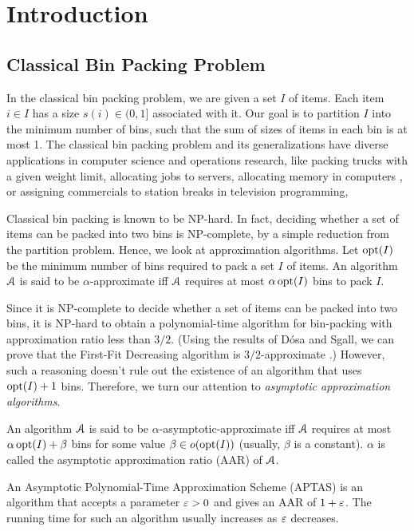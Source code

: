 \chapter{Introduction}
\label{chap:intro}

\section{Classical Bin Packing Problem}

In the classical bin packing problem, we are given a set $I$ of items.
Each item $i \in I$ has a size $s(i) \in (0, 1]$ associated with it.
Our goal is to partition $I$ into the minimum number of bins,
such that the sum of sizes of items in each bin is at most 1.
The classical bin packing problem and its generalizations
have diverse applications in computer science and operations research,
like packing trucks with a given weight limit,
allocating jobs to servers,
allocating memory in computers \cite{handbook-of-combinopt-bp},
or assigning commercials to station breaks in television programming,

Classical bin packing is known to be NP-hard.
In fact, deciding whether a set of items can be packed into two bins is NP-complete,
by a simple reduction from the partition problem.
Hence, we look at approximation algorithms.
Let $\operatorname{opt}(I)$ be the minimum number of bins required to pack a set $I$ of items.
An algorithm $\mathcal{A}$ is said to be $\alpha$-approximate iff
$\mathcal{A}$ requires at most $\alpha\operatorname{opt}(I)$ bins to pack $I$.

Since it is NP-complete to decide whether a set of items can be packed into two bins,
it is NP-hard to obtain a polynomial-time algorithm for bin-packing
with approximation ratio less than $3/2$.
(Using the results of D\'osa and Sgall, we can prove that the First-Fit Decreasing algorithm
is $3/2$-approximate \cite{dosa2013first,dosa2007tight}.)
However, such a reasoning doesn't rule out the existence of an algorithm
that uses $\operatorname{opt}(I) + 1$ bins.
Therefore, we turn our attention to \emph{asymptotic approximation algorithms}.
\begin{definition}
An algorithm $\mathcal{A}$ is said to be $\alpha$-asymptotic-approximate iff
$\mathcal{A}$ requires at most $\alpha\operatorname{opt}(I) + \beta$ bins
for some value $\beta \in o(\operatorname{opt}(I))$ (usually, $\beta$ is a constant).
$\alpha$ is called the asymptotic approximation ratio (AAR) of $\mathcal{A}$.
\end{definition}

An Asymptotic Polynomial-Time Approximation Scheme (APTAS) is an algorithm
that accepts a parameter $\varepsilon > 0$ and gives an AAR of $1+\varepsilon$.
The running time for such an algorithm usually increases as $\varepsilon$ decreases.

